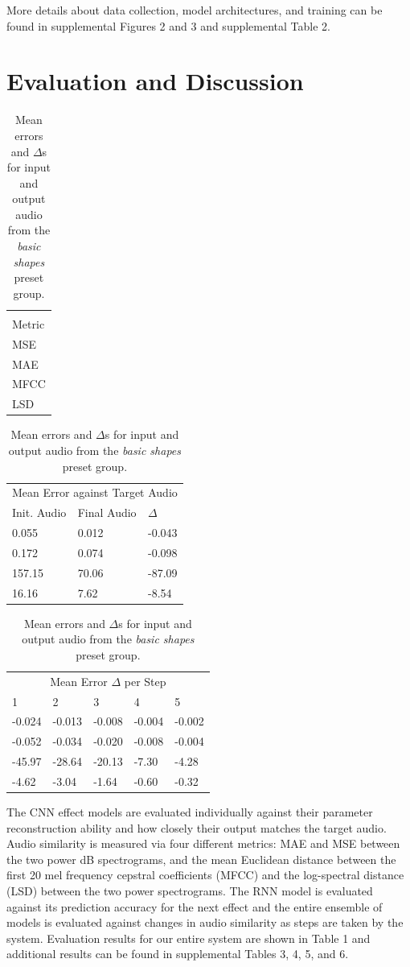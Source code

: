 \documentclass{article}
\begin{document}
More details about data collection, model architectures, and training can be found in supplemental Figures 2 and 3 and supplemental Table 2. 

\section{Evaluation and Discussion}

\begin{table}[h]
  \caption{Mean errors and $\Delta$s for input and output audio from the \emph{basic shapes} preset group.}
  \centering
  \begin{tabular}{l}
    \toprule
    \multicolumn{1}{c}{} \\
    \cmidrule(r){1-1}
    Metric \\
    \midrule
    MSE \\
    MAE \\
    MFCC \\
    LSD \\
    \bottomrule
  \end{tabular}
  \begin{tabular}{lll}
    \toprule
    \multicolumn{3}{c}{Mean Error against Target Audio} \\
    \cmidrule(r){1-3}
    Init. Audio & Final Audio & $\Delta$ \\
    \midrule
    0.055 & 0.012 & -0.043 \\
    0.172 & 0.074 & -0.098 \\
    157.15 & 70.06 & -87.09 \\
    16.16 & 7.62 & -8.54 \\
    \bottomrule
  \end{tabular}
  \begin{tabular}{lllll}
    \toprule
    \multicolumn{5}{c}{Mean Error $\Delta$ per Step} \\
    \cmidrule(r){1-5}
    1 & 2 & 3 & 4 & 5 \\
    \midrule
    -0.024 & -0.013 & -0.008 & -0.004 & -0.002 \\
    -0.052 & -0.034 & -0.020 & -0.008 & -0.004 \\
    -45.97 & -28.64 & -20.13 & -7.30 & -4.28 \\
    -4.62 & -3.04 & -1.64 & -0.60 & -0.32 \\
    \bottomrule
  \end{tabular}
\end{table}

The CNN effect models are evaluated individually against their parameter reconstruction ability and how closely their output matches the target audio. Audio similarity is measured via four different metrics: MAE and MSE between the two power dB spectrograms, and the mean Euclidean distance between the first 20 mel frequency cepstral coefficients (MFCC) and the log-spectral distance (LSD) between the two power spectrograms. The RNN model is evaluated against its prediction accuracy for the next effect and the entire ensemble of models is evaluated against changes in audio similarity as steps are taken by the system. Evaluation results for our entire system are shown in Table 1 and additional results can be found in supplemental Tables 3, 4, 5, and 6.
\end{document}
